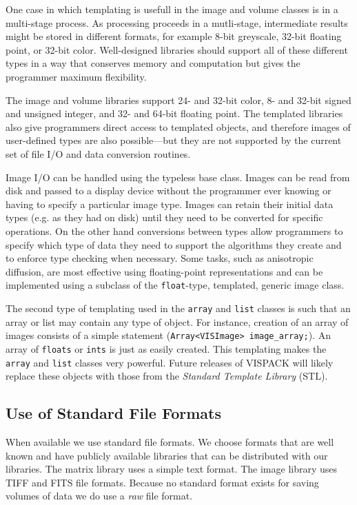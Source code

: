 One case in which templating is usefull in the image and volume 
classes is in a multi-stage process.  As processing proceeds in a 
mutli-stage, intermediate results might be stored in different 
formats, for example 8-bit greyscale, 32-bit floating point, or 32-bit 
color.  Well-designed libraries should support all of these different 
types in a way that conserves memory and computation but gives the 
programmer maximum flexibility.

The image and volume libraries support 24- and 32-bit color, 8- and
32-bit signed and unsigned integer, and 32- and 64-bit floating point.
The templated libraries also give programmers direct access to templated
objects, and therefore images of user-defined types are also 
possible---but they are not supported by the current set of file I/O 
and data conversion routines.

Image I/O can be handled using the typeless base class.  Images can be read 
from disk and passed to a display device without the programmer ever 
knowing or having to specify a particular image type.  Images can 
retain their initial data types (e.g.  as they had on disk) until they 
need to be converted for specific operations.  On the other hand 
conversions between types allow programmers to specify which type of 
data they need to support the algorithms they create and to enforce 
type checking when necessary.  Some tasks, such as anisotropic 
diffusion, are most effective using floating-point representations and 
can be implemented using a subclass of the {\tt float}-type, templated, 
generic image class.

The second type of templating used in the {\tt array} and {\tt list} classes
is such that an array or list may contain any type of object.
For instance, creation of an array of images consists of
a simple statement ({\tt Array<VISImage> image\_array;}).
An array of {\tt floats} or {\tt ints} is just as easily created.
This templating makes the {\tt array} and {\tt list} classes
very powerful.  Future releases of VISPACK will likely replace these 
objects with those from the {\em Standard Template Library} (STL).

\subsection{Use of Standard File Formats}
When available we use standard file formats.  We choose formats that 
are well known and have publicly available libraries that can be 
distributed with our libraries.  The matrix library uses a simple text 
format.  The image library uses TIFF and FITS file formats.  Because 
no standard format exists for saving volumes of data we do use a {\em 
raw} file format.

